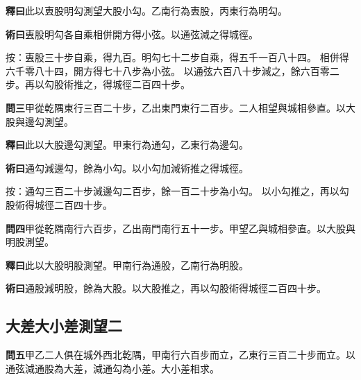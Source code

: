 \documentclass[12pt,a4paper]{article}
\newcommand{\Section}[1]{\subsection*{#1}}
\begin{document}
\vspace{0.3em}

\noindent\textbf{釋曰}\quad 此以叀股明勾測望大股小勾。乙南行為叀股，丙東行為明勾。

\vspace{0.3em}

\noindent\textbf{術曰}\quad 叀股明勾各自乘相併開方得小弦。以通弦減之得城徑。

\vspace{0.3em}

\noindent
按：叀股三十步自乘，得九百。明勾七十二步自乘，得五千一百八十四。
相併得六千零八十四，開方得七十八步為小弦。
以通弦六百八十步減之，餘六百零二步。再以勾股術推之，得城徑二百四十步。

\vspace{0.5em}

\noindent\textbf{問三}\quad 甲從乾隅東行三百二十步，乙出東門東行二百步。二人相望與城相參直。以大股與邊勾測望。

\vspace{0.3em}

\noindent\textbf{釋曰}\quad 此以大股邊勾測望。甲東行為通勾，乙東行為邊勾。

\vspace{0.3em}

\noindent\textbf{術曰}\quad 通勾減邊勾，餘為小勾。以小勾加減術推之得城徑。

\vspace{0.3em}

\noindent
按：通勾三百二十步減邊勾二百步，餘一百二十步為小勾。
以小勾推之，再以勾股術得城徑二百四十步。

\vspace{0.5em}

\noindent\textbf{問四}\quad 甲從乾隅南行六百步，乙出南門南行五十一步。甲望乙與城相參直。以大股與明股測望。

\vspace{0.3em}

\noindent\textbf{釋曰}\quad 此以大股明股測望。甲南行為通股，乙南行為明股。

\vspace{0.3em}

\noindent\textbf{術曰}\quad 通股減明股，餘為大股。以大股推之，再以勾股術得城徑二百四十步。

\Section{大差大小差測望二}

\noindent\textbf{問五}\quad 甲乙二人俱在城外西北乾隅，甲南行六百步而立，乙東行三百二十步而立。以通弦減通股為大差，減通勾為小差。大小差相求。
\end{document}
